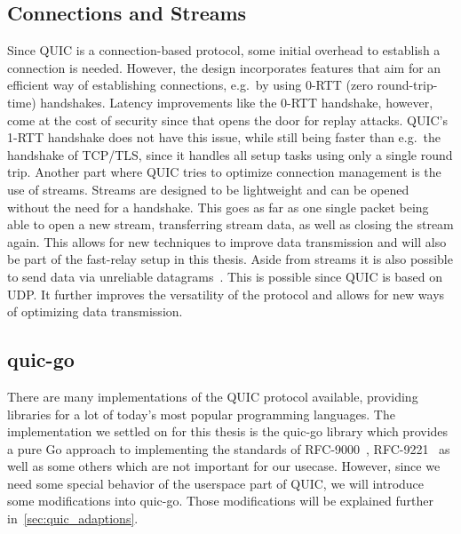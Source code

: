 \subsection{Connections and Streams}
Since QUIC is a connection-based protocol, some initial overhead to establish a connection is needed.
However, the design incorporates features that aim for an efficient way of establishing 
connections, e.g.\ by using 0-RTT (zero round-trip-time) handshakes. 
Latency improvements like the 0-RTT handshake, however, come at the cost of security since that opens 
the door for replay attacks.
QUIC's 1-RTT handshake does not have this issue, while still being faster
than e.g.\ the handshake of TCP/TLS, since it handles all setup tasks using only
a single round trip.
Another part where QUIC tries to optimize connection management is the use of streams.
Streams are designed to be lightweight and can be opened without the need for a handshake.
This goes as far as one single packet being able to open a new stream, transferring stream data,
as well as closing the stream again.
This allows for new techniques to improve data transmission and will also be part of the fast-relay 
setup in this thesis.
Aside from streams it is also possible to send data via unreliable 
datagrams~\parencite{rfc-9221}.
This is possible since QUIC is based on UDP\@.
It further improves the versatility of the protocol and allows 
for new ways of optimizing data transmission.

\subsection{quic-go}
There are many implementations of the QUIC protocol available, providing libraries for a lot of 
today's most popular programming languages.
The implementation we settled on for this thesis is the quic-go library which provides a pure Go 
approach to implementing the standards of RFC-9000~\parencite{rfc-9000}, 
RFC-9221~\parencite{rfc-9221} as well as some others which are not 
important for our usecase. 
However, since we need some special behavior of the userspace part of QUIC, we will introduce some 
modifications into quic-go.  
Those modifications will be explained further in~\autoref{sec:quic_adaptions}.

